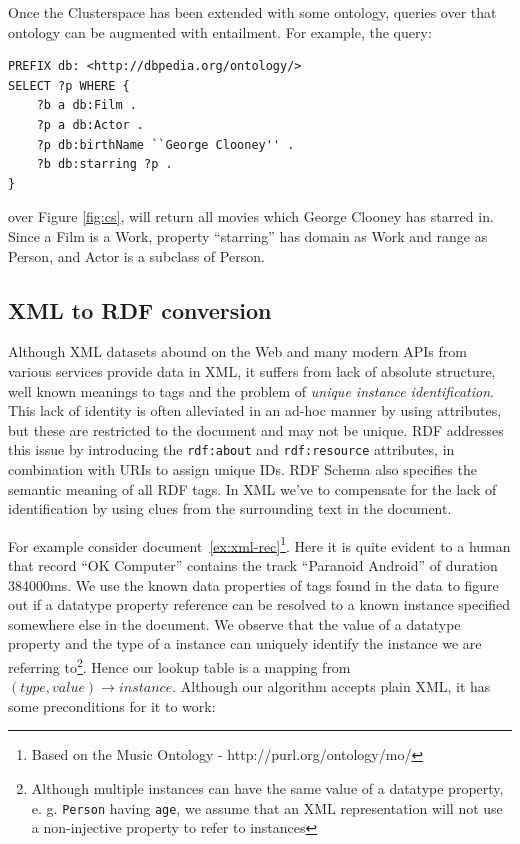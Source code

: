 \documentclass[journal]{IEEEtran}
\begin{document}
Once the Clusterspace has been extended with some ontology, queries over that
ontology can be augmented with entailment. For example, the query:

\begin{verbatim}
PREFIX db: <http://dbpedia.org/ontology/>
SELECT ?p WHERE {
    ?b a db:Film .
    ?p a db:Actor .
    ?p db:birthName ``George Clooney'' .
    ?b db:starring ?p .
}
\end{verbatim}

over Figure \ref{fig:cs}, will return all movies which George Clooney has starred in.
Since a Film is a Work, property ``starring'' has domain as Work
and range as Person, and Actor is a subclass of Person.

\subsection{XML to RDF conversion}

Although XML datasets abound on the Web and many modern APIs from various
services provide data in XML, it suffers from lack of absolute structure, well
known meanings to tags and the problem of \emph{unique instance
identification}. This lack of identity is often alleviated in an ad-hoc manner
by using attributes, but these are restricted to the document and may not be
unique. RDF addresses this issue by introducing the \texttt{rdf:about} and
\texttt{rdf:resource} attributes, in combination with URIs to assign unique
IDs. RDF Schema also specifies the semantic meaning of all RDF tags. In XML
we've to compensate for the lack of identification by using clues from the
surrounding text in the document.

For example consider document~\ref{ex:xml-rec}\footnote{Based on the Music
Ontology - http://purl.org/ontology/mo/}. Here it is quite evident to a human
that record ``OK Computer'' contains the track ``Paranoid Android'' of duration
384000ms. We use the known data properties of tags found in the data to figure
out if a datatype property reference can be resolved to a known instance
specified somewhere else in the document. We observe that the value of
a datatype property and the type of a instance can uniquely identify the
instance we are referring to\footnote{Although multiple instances can have the
    same value of a datatype property, e. g. \texttt{Person} having
    \texttt{age}, we assume that an XML representation will not use
a non-injective property to refer to instances}. Hence our lookup table is
a mapping from $(type, value)\rightarrow instance$. Although our algorithm
accepts plain XML, it has some preconditions for it to work:
\end{document}
